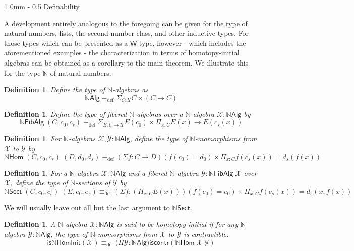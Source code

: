 \documentclass[10pt,a4paper,oneside,reqno]{amsart}
\makeatletter
\numberwithin{equation}{section}
\renewcommand{\section}{\@startsection
  {section}%
   {1}%
  {0mm}%
   {-\baselineskip}%
  {0.5\baselineskip}%
   {\Large\bfseries}}%
\theoremstyle{mythm}
\theoremstyle{mydef}
\newtheorem{definition}[theorem]{Definition}
\theoremstyle{myrmk}
\newcommand{\deq}{\equiv}
\newcommand{\defeq}{\deq_{\mathrm{def}}}
\newcommand{\iscontr}{\mathsf{iscontr}}
\newcommand{\U}{\mathcal{U}}
\newcommand{\prd}[1]{\Pi_{#1}}
\newcommand{\sm}[1]{\Sigma_{#1}}
\newcommand{\nat}{\ensuremath{\mathbb{N}}}
\newcommand{\W}{\mathsf{W}}
\newcommand{\NatAlg}{\nat\mathsf{Alg}}
\newcommand{\NatHom}{\nat\mathsf{Hom}}
\newcommand{\NatFibAlg}{\nat\mathsf{FibAlg}}
\newcommand{\NatFibHom}{\nat\mathsf{Sect}}
\newcommand{\IsNatHInit}{\mathsf{is}\nat\mathsf{HomInit}}
\newcommand{\X}{\mathcal{X}}
\newcommand{\Y}{\mathcal{Y}}
\makeatother
\begin{document}
\section{Definability}
\label{sec:definability}

A development entirely analogous to the foregoing can be given for the type of natural numbers, lists, the second number class, and other inductive types. For those types which can be presented as a $\W$-type, however - which includes the aforementioned examples - the characterization in terms of homotopy-initial algebras can be obtained as a corollary to the main theorem. We illustrate this for the type $\nat$ of natural numbers.

\begin{definition}\label{def:NatAlg}
Define the type of \emph{$\nat$-algebras} as 
\[\NatAlg \defeq \sm{C : \U} C \times (C \to C) \]
\end{definition}

\begin{definition}\label{def:NatFibAlg}
Define the type of \emph{fibered $\nat$-algebras} over a $\nat$-algebra $\X : \NatAlg$ by
\[\NatFibAlg \; (C,c_0,c_s) \defeq \sm{E : C \to \U} E(c_0) \times \prd{x:C} E(x) \to E(c_s(x)) \]
\end{definition}

\begin{definition}\label{def:NatHom}
For $\nat$-algebras $\X,\Y: \NatAlg$, define the type of \emph{$\nat$-momorphisms} from $\X$ to $\Y$ by 
\[\NatHom \; (C,c_0,c_s) \; (D,d_0,d_s) \defeq (\Sigma f:C \to D) (f(c_0) = d_0) \times \prd{x:C} f(c_s(x)) = d_s(f(x)) \]
\end{definition}

\begin{definition}\label{def:NatFibHom}
For a $\nat$-algebra $\X : \NatAlg$ and a fibered $\nat$-algebra $\Y : \NatFibAlg \; \X$ over $\X$, define the type of \emph{$\nat$-sections} of $\Y$ by
\[\NatFibHom \; (C,c_0,c_s) \; (E,e_0,e_s) \defeq (\Sigma f:(\prd{x:C} E(x))) (f(c_0) = e_0) \times \prd{x:C} f(c_s(x)) = d_s(x,f(x)) \]
\end{definition}
We will usually leave out all but the last argument to $\NatFibHom$.

\begin{definition}\label{def:NatHInit}
A $\nat$-algebra $\X : \NatAlg$ is said to be \emph{homotopy-initial} if for any $\nat$-algebra $\Y : \NatAlg$, the type of $\nat$-momorphisms from $\X$ to $\Y$ is contractible:
\[ \IsNatHInit(\X) \defeq \big(\Pi \Y:\NatAlg\big) \iscontr(\NatHom \; \X \; \Y) \]  
\end{definition}
\end{document}
